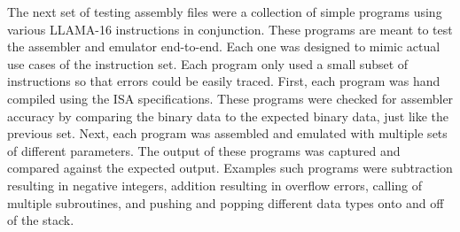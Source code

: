 \documentclass[man,hidelinks,floatsintext]{apa7}
\begin{document}
The next set of testing assembly files were a collection of simple programs using various LLAMA-16 instructions in conjunction. These programs are meant to test the assembler and emulator end-to-end. Each one was designed to mimic actual use cases of the instruction set. Each program only used a small subset of instructions so that errors could be easily traced. First, each program was hand compiled using the ISA specifications. These programs were checked for assembler accuracy by comparing the binary data to the expected binary data, just like the previous set. Next, each program was assembled and emulated with multiple sets of different parameters. The output of these programs was captured and compared against the expected output. Examples such programs were subtraction resulting in negative integers, addition resulting in overflow errors, calling of multiple subroutines, and pushing and popping different data types onto and off of the stack.
\end{document}
